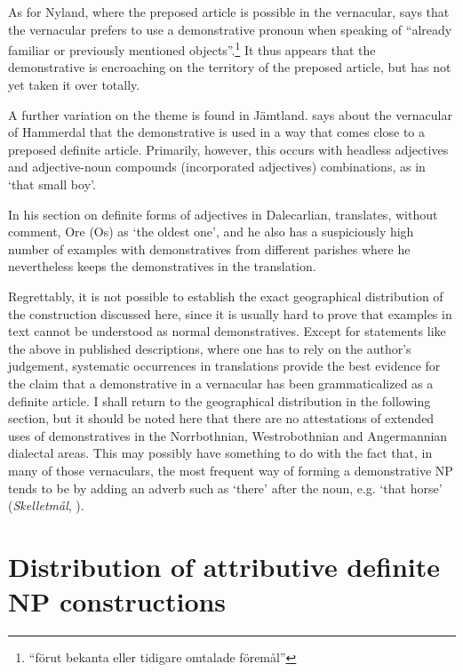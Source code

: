 As for Nyland, where the preposed article is possible in the vernacular, \citet[21]{Lundström1939} says that the vernacular prefers to use a demonstrative pronoun when speaking of “already familiar or previously mentioned objects”.\footnote{ “förut bekanta eller tidigare omtalade föremål”} It thus appears that the demonstrative is encroaching on the territory of the preposed article, but has not yet taken it over totally. 

A further variation on the theme is found in Jämtland. \citet[38]{Reinhammar2005} says about the vernacular of Hammerdal that the demonstrative is used in a way that comes close to a preposed definite article. Primarily, however, this occurs with headless adjectives and adjective-noun compounds (incorporated adjectives) combinations, as in ‘that small boy’. 

In his section on definite forms of adjectives in Dalecarlian, \citet[147]{Levander1928} translates, without comment, Ore (Os)  as ‘the oldest one’, and he also has a suspiciously high number of examples with demonstratives from different parishes where he nevertheless keeps the demonstratives in the translation. 

Regrettably, it is not possible to establish the exact geographical distribution of the construction discussed here, since it is usually hard to prove that examples in text cannot be understood as normal demonstratives. Except for statements like the above in published descriptions, where one has to rely on the author’s judgement, systematic occurrences in translations provide the best evidence for the claim that a demonstrative in a vernacular has been grammaticalized as a definite article. I shall return to the geographical distribution in the following section, but it should be noted here that there are no attestations of extended uses of demonstratives in the Norrbothnian, Westrobothnian and Angermannian dialectal areas. This may possibly have something to do with the fact that, in many of those vernaculars, the most frequent way of forming a demonstrative NP tends to be by adding an adverb such as  ‘there’ after the noun, e.g.  ‘that horse’ (\textit{Skelletmål}, \citet[41]{Marklund1976}).

\section{Distribution of attributive definite NP constructions}
\label{bkm:Ref141070030}

